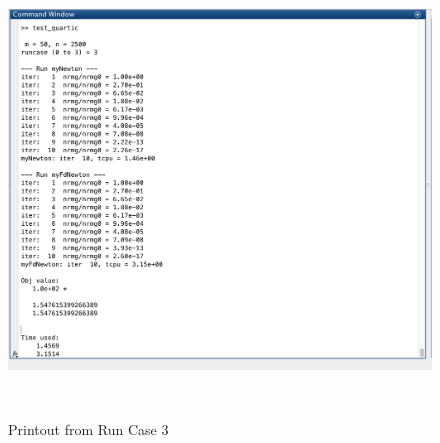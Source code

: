 \begin{figure}[H]
\centering
\includegraphics[height=12cm]{p_10}
\caption{Printout from Run Case $3$}
\end{figure}


